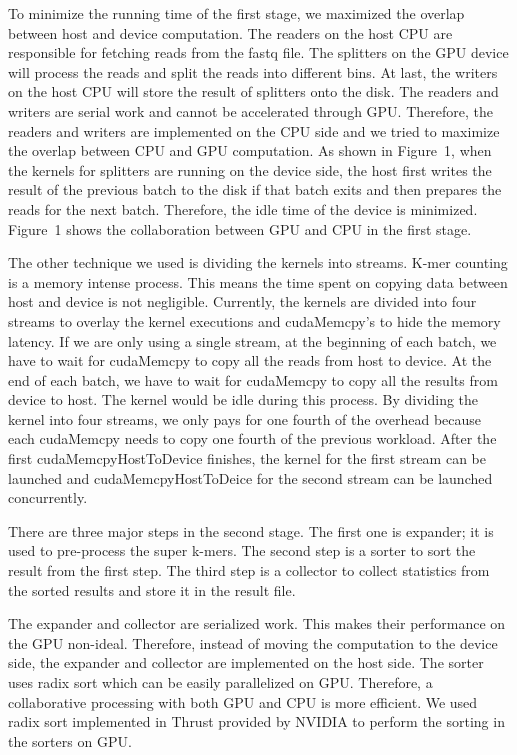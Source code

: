 \documentclass{bioinfo}
\begin{document}
\begin{methods}
To minimize the running time of the first stage, we maximized the overlap between host and
device computation.
The readers on the host CPU are responsible for fetching reads from the fastq file.
The splitters on the GPU device will process the reads and split the reads into different
 bins.
At last, the writers on the host CPU will store the result of splitters onto the disk.
The readers and writers are serial work and cannot be accelerated through GPU.
Therefore, the readers and writers are implemented on the CPU side and we tried to 
maximize the overlap between CPU and GPU computation.
As shown in Figure~1\vphantom{\ref{fig:01}}, when the kernels for splitters are running on
the device side, the host first writes the result of the previous batch to the disk if
that batch exits and then prepares the reads for the next batch.
Therefore, the idle time of the device is minimized.
Figure~1\vphantom{\ref{fig:01}} shows the collaboration between GPU and CPU in
the first stage.

The other technique we used is dividing the kernels into streams.
K-mer counting is a memory intense process. This means the time spent on copying data
between host and device is not negligible.
Currently, the kernels are divided into four streams to overlay the kernel executions and
cudaMemcpy's to hide the memory latency.
If we are only using a single stream, at the beginning of each batch, we have to wait for
cudaMemcpy to copy all the reads from host to device.
At the end of each batch, we have to wait for cudaMemcpy to copy all the results from
device to host.
The kernel would be idle during this process.
By dividing the kernel into four streams, we only pays for one fourth of the overhead
because each cudaMemcpy needs to copy one fourth of the previous workload.
After the first cudaMemcpyHostToDevice finishes, the kernel for the first stream can be
launched and cudaMemcpyHostToDeice for the second stream can be launched concurrently.

There are three major steps in the second stage.
The first one is expander; it is used to pre-process the super k-mers. The second step is
a sorter to sort the result from the first step. The third step is a collector to collect
statistics from the sorted results and store it in the result file.

The expander and collector are serialized work. This makes their performance on the GPU
non-ideal.
Therefore, instead of moving the computation to the device side, the expander and
collector are implemented on the host side.
The sorter uses radix sort which can be easily parallelized on GPU.
Therefore, a collaborative processing with both GPU and CPU is more efficient.
We used radix sort implemented in Thrust \citep{Jared} provided by NVIDIA to perform the sorting in the sorters on GPU.


\end{methods}
\end{document}
